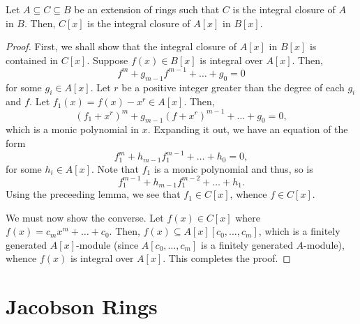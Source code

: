 \begin{theorem}
    Let $A\subseteq C\subseteq B$ be an extension of rings such that $C$ is the integral closure of $A$ in $B$. Then, $C[x]$ is the integral closure of $A[x]$ in $B[x]$.
\end{theorem}
\begin{proof}
    First, we shall show that the integral closure of $A[x]$ in $B[x]$ is contained in $C[x]$. Suppose $f(x)\in B[x]$ is integral over $A[x]$. Then, 
    \begin{equation*}
        f^m + g_{m - 1}f^{m - 1} + \dots + g_0 = 0
    \end{equation*}
    for some $g_i\in A[x]$. Let $r$ be a positive integer greater than the degree of each $g_i$ and $f$. Let $f_1(x) = f(x) - x^r\in A[x]$. Then, 
    \begin{equation*}
        (f_1 + x^r)^m + g_{m - 1}(f + x^r)^{m - 1} + \dots + g_0 = 0,
    \end{equation*}
    which is a monic polynomial in $x$. Expanding it out, we have an equation of the form 
    \begin{equation*}
        f_1^m + h_{m - 1}f_1^{m - 1} + \dots + h_0 = 0,
    \end{equation*}
    for some $h_i\in A[x]$. Note that $f_1$ is a monic polynomial and thus, so is 
    \begin{equation*}
        f_1^{m - 1} + h_{m - 1}f_1^{m - 2} + \dots + h_1.
    \end{equation*}
    Using the preceeding lemma, we see that $f_1\in C[x]$, whence $f\in C[x]$.

    We must now show the converse. Let $f(x)\in C[x]$ where $f(x) = c_mx^m + \dots + c_0$. Then, $f(x)\subseteq A[x][c_0,\dots,c_m]$, which is a finitely generated $A[x]$-module (since $A[c_0,\dots,c_m]$ is a finitely generated $A$-module), whence $f(x)$ is integral over $A[x]$. This completes the proof.
\end{proof}

\section{Jacobson Rings}

